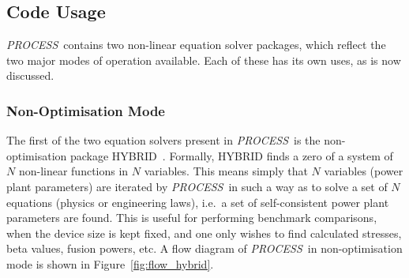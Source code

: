 \documentclass[11pt,a4paper]{report}
\newcommand{\PS}{\mbox{\it PROCESS\/ }}
\begin{document}
\subsection{Code Usage}

\PS contains two non-linear equation solver packages, which reflect the two
major modes of operation available. Each of these has its own uses, as is now
discussed.

\subsubsection{Non-Optimisation Mode}

The first of the two equation solvers present in \PS is the non-optimisation
package HYBRID~\cite{hybrid_anl,hybrid}. Formally, HYBRID finds a zero of a
system of $N$ non-linear functions in $N$ variables. This means simply that
$N$ variables (power plant parameters) are iterated by \PS in such a way as to
solve a set of $N$ equations (physics or engineering laws), i.e.\ a set of
self-consistent power plant parameters are found. This is useful for
performing benchmark comparisons, when the device size is kept fixed, and one
only wishes to find calculated stresses, beta values, fusion powers, etc. A
flow diagram of \PS in non-optimisation mode is shown in
Figure~\ref{fig:flow_hybrid}.


\setlength{\unitlength}{1mm}
\end{document}

